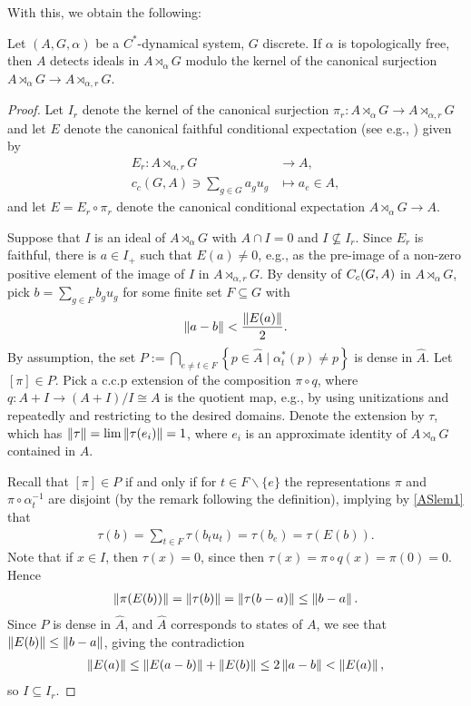 With this, we obtain the following:
\begin{theorem}
	Let $(A,G,\alpha)$ be a $C^*$-dynamical system, $G$ discrete. If $\alpha$ is topologically free, then $A$ detects ideals in $A \rtimes_\alpha G$ modulo the kernel of the canonical surjection $A \rtimes_\alpha G \to A \rtimes_{\alpha,r}G$.
	\label{ASthm1}
\end{theorem}
\begin{proof}
	Let $I_r$ denote the kernel of the canonical surjection $ \pi_r \colon A \rtimes_\alpha G \to A \rtimes_{\alpha , r}G$ and let $E$ denote the canonical faithful conditional expectation (see e.g., \cite[Proposition 4.1.9]{brown2008c}) given by
	\begin{align*}
	E_r \colon A \rtimes_{\alpha,r} G &\to A, \\ 
		c_c(G,A) \ni \sum_{g \in G} a_g  u_g &\mapsto a_e \in A,
	\end{align*}
	and let $E = E_r \circ \pi_r$ denote the canonical conditional expectation $A \rtimes_{\alpha }G \to A$.
	
	Suppose that $I$ is an ideal of $A \rtimes_\alpha G$ with $A \cap I=0$ and $I \not \subseteq I_r$. Since $E_r$ is faithful, there is $a \in I_+$ such that $E(a) \neq 0$, e.g., as the pre-image of a non-zero positive element of the image of $I$ in $A \rtimes_{\alpha,r}G$. By density of $C_c(G,A)$ in $A \rtimes_\alpha G$, pick $b = \sum_{g \in F} b_g u_g$ for some finite set $F \subseteq G$ with
	\begin{align*}
		\left\lVert a - b \right\rVert < \frac{\left\lVert E (a) \right\rVert}{2}.
	\end{align*}
	By assumption, the set $P := \bigcap_{e \neq t \in F}\left\{ p \in \hat A \mid \alpha_{t}^*(p) \neq p \right\}$ is dense in $\hat A$. Let $[\pi] \in P$. Pick a c.c.p extension of the composition $\pi \circ q$, where $q \colon A+I \to (A+I)/I\cong A$ is the quotient map, e.g., by using unitizations and \cite[Proposition 2.2.1]{brown2008c} repeatedly and restricting to the desired domains. Denote the extension by $\tau$, which has $\left\lVert \tau \right\rVert = \lim \left\lVert \tau(e_i)\right\rVert = 1$, where $e_i$ is an approximate identity of $A \rtimes_\alpha G$ contained in $A$. 
	
	Recall that $[\pi] \in P$ if and only if for $t \in F\backslash\{e\}$ the representations $\pi$ and $\pi \circ \alpha_{t}^{-1}$ are disjoint (by the remark following the definition), implying by \cref{ASlem1} that
	\begin{align*}
		\tau(b) = \sum_{t \in F} \tau(b_t u_t) = \tau(b_e) = \tau(E(b)).
	\end{align*}
	Note that if $x \in I$, then $\tau(x) = 0$, since then $\tau(x) = \pi \circ q(x) = \pi(0) =0$. Hence
	\begin{align*}
		\left\lVert \pi(E(b))\right\rVert = \left\lVert \tau(b) \right\rVert = \left\lVert \tau(b-a)\right\rVert \leq \left\lVert b-a\right\rVert.
	\end{align*}
	Since $P$ is dense in $\hat A$, and $\hat A$ corresponds to states of $A$, we see that $\left\lVert E(b)\right\rVert \leq \left\lVert b-a\right\rVert$, giving the contradiction
	\begin{align*}
		\left\lVert E(a) \right\rVert \leq \left\lVert E(a-b)\right\rVert + \left\lVert E(b)\right\rVert \leq 2 \left\lVert a-b\right\rVert <  \left\lVert E(a)\right\rVert,
	\end{align*}
	so $I \subseteq I_r$.
\end{proof}
